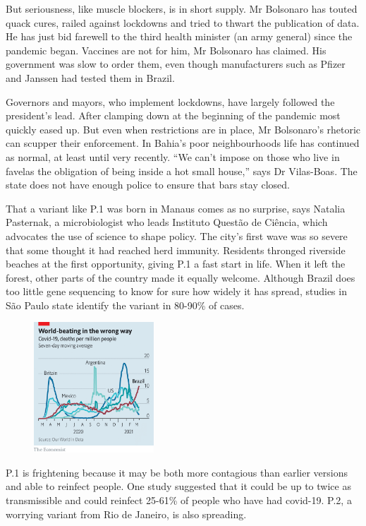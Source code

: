 \documentclass{article}
\begin{document}
But seriousness, like muscle blockers, is in short supply. Mr Bolsonaro has touted quack cures, railed against lockdowns and tried to thwart the publication of data. He has just bid farewell to the third health minister (an army general) since the pandemic began. Vaccines are not for him, Mr Bolsonaro has claimed. His government was slow to order them, even though manufacturers such as Pfizer and Janssen had tested them in Brazil. 

Governors and mayors, who implement lockdowns, have largely followed the president's lead. After clamping down at the beginning of the pandemic most quickly eased up. But even when restrictions are in place, Mr Bolsonaro's rhetoric can scupper their enforcement. In Bahia's poor neighbourhoods life has continued as normal, at least until very recently. ``We can't impose on those who live in favelas the obligation of being inside a hot small house,'' says Dr Vilas-Boas. The state does not have enough police to ensure that bars stay closed. 

That a variant like P.1 was born in Manaus comes as no surprise, says Natalia Pasternak, a microbiologist who leads Instituto Questão de Ciência, which advocates the use of science to shape policy. The city's first wave was so severe that some thought it had reached herd immunity. Residents thronged riverside beaches at the first opportunity, giving P.1 a fast start in life. When it left the forest, other parts of the country made it equally welcome. Although Brazil does too little gene sequencing to know for sure how widely it has spread, studies in São Paulo state identify the variant in 80-90\% of cases. 

\begin{figure}[h]
\centering
\includegraphics[width=0.4\textwidth]{images/20210327_AMC277.png}
\end{figure}


P.1 is frightening because it may be both more contagious than earlier versions and able to reinfect people. One study suggested that it could be up to twice as transmissible and could reinfect 25-61\% of people who have had covid-19. P.2, a worrying variant from Rio de Janeiro, is also spreading. 
\end{document}
